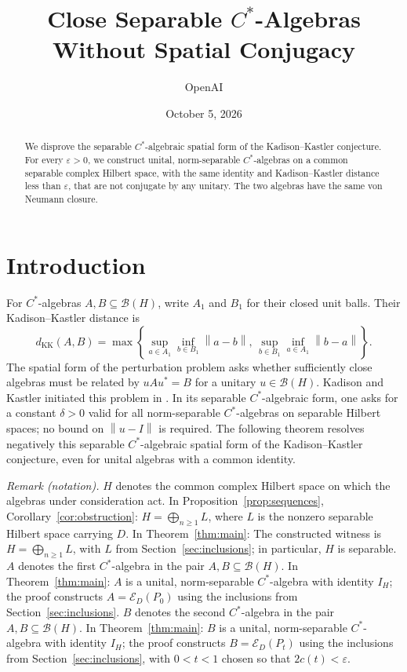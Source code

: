 \documentclass[11pt]{article}
\title{Close Separable $C^*$-Algebras\texorpdfstring{\\}{ }Without Spatial Conjugacy}
\author{OpenAI}
\date{October 5, 2026}
\theoremstyle{definition}
\theoremstyle{remark}
\newcommand{\B}{\mathcal B}
\newcommand{\E}{\mathcal E}
\newcommand{\KK}{d_{\mathrm{KK}}}
\newcommand{\id}{I}
\newcommand{\norm}[1]{\left\|#1\right\|}
\begin{document}
\maketitle

\begin{abstract}
We disprove the separable $C^*$-algebraic spatial form of the
Kadison--Kastler conjecture. For every $\varepsilon>0$, we construct
unital, norm-separable $C^*$-algebras on a common separable complex
Hilbert space, with the same identity and Kadison--Kastler distance less
than $\varepsilon$, that are not conjugate by any unitary. The two
algebras have the same von Neumann closure.
\end{abstract}

\section{Introduction}\label{sec:intro}

For $C^*$-algebras $A,B\subseteq\B(H)$, write $A_1$ and $B_1$ for their
closed unit balls. Their Kadison--Kastler distance is
\begin{equation}\label{eq:kk}
\KK(A,B)=\max\left\{
\sup_{a\in A_1}\inf_{b\in B_1}\norm{a-b},\,
\sup_{b\in B_1}\inf_{a\in A_1}\norm{b-a}\right\}.
\end{equation}
The spatial form of the perturbation problem asks whether sufficiently close
algebras must be related by $uAu^*=B$ for a unitary $u\in\B(H)$.
Kadison and Kastler initiated this problem in \cite{KK72}. In its separable
$C^*$-algebraic form, one asks for a constant $\delta>0$ valid for all
norm-separable $C^*$-algebras on separable Hilbert spaces; no bound on
$\norm{u-\id}$ is required. The following theorem resolves negatively this
separable $C^*$-algebraic spatial form of the Kadison--Kastler conjecture,
even for unital algebras with a common identity.

\noindent\textit{Remark (notation).} $H$ denotes the common complex Hilbert space on which the algebras under consideration act. In Proposition~\ref{prop:sequences}, Corollary~\ref{cor:obstruction}: $H=\bigoplus_{n\ge1}L$, where $L$ is the nonzero separable Hilbert space carrying $D$. In Theorem~\ref{thm:main}: The constructed witness is $H=\bigoplus_{n\ge1}L$, with $L$ from Section~\ref{sec:inclusions}; in particular, $H$ is separable. $A$ denotes the first $C^*$-algebra in the pair $A,B\subseteq\B(H)$. In Theorem~\ref{thm:main}: $A$ is a unital, norm-separable $C^*$-algebra with identity $\id_H$; the proof constructs $A=\E_D(P_0)$ using the inclusions from Section~\ref{sec:inclusions}. $B$ denotes the second $C^*$-algebra in the pair $A,B\subseteq\B(H)$. In Theorem~\ref{thm:main}: $B$ is a unital, norm-separable $C^*$-algebra with identity $\id_H$; the proof constructs $B=\E_D(P_t)$ using the inclusions from Section~\ref{sec:inclusions}, with $0<t<1$ chosen so that $2c(t)<\varepsilon$.
\end{document}
